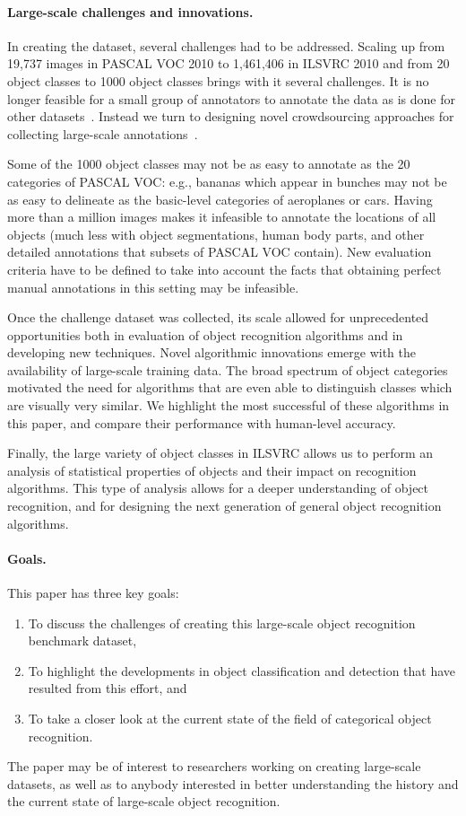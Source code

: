 \paragraph{Large-scale challenges and innovations.} In creating the dataset, several challenges had to be addressed. Scaling up from 19,737 images in PASCAL VOC 2010 to 1,461,406
in ILSVRC 2010 and  from 20 object classes to 1000 object classes brings with it several challenges. It is no longer feasible for a small group of annotators to annotate the data
as is done for other datasets~\citep{Caltech101,MSRC,PASCALVOC,SUN}.  Instead we turn to designing novel crowdsourcing approaches for collecting large-scale annotations~\citep{Su12,ImageNet,Deng14}.

Some of the 1000 object classes may not be as easy to annotate as the 20 categories of PASCAL VOC: e.g., bananas which appear in bunches may not be as easy to delineate as the basic-level categories of aeroplanes or cars. Having more than a million images makes it infeasible to annotate the locations of all objects (much less with object segmentations, human body parts, and other detailed annotations that subsets of PASCAL VOC contain). New evaluation criteria  have to be defined to take into account the facts that obtaining perfect manual annotations in this setting may be infeasible.

Once the challenge dataset was collected, its scale allowed for
unprecedented opportunities both in evaluation of object recognition
algorithms and in developing new techniques. Novel algorithmic innovations emerge with the availability of large-scale training data.  The broad spectrum of object categories motivated the 
need for algorithms that are even able to distinguish classes which are visually very similar. We highlight the most successful of these algorithms in this paper, and compare their performance with human-level accuracy.

Finally, the large variety of object classes in ILSVRC allows us to perform an analysis of statistical properties of objects and their impact on recognition algorithms. This type of analysis allows for a deeper understanding of object recognition, and for designing the next generation of general object recognition algorithms.

\paragraph{Goals.} This paper has three key goals:
\begin{enumerate}
\item To discuss the challenges of creating this large-scale object recognition benchmark dataset,
\item To highlight
the developments in  object classification and detection that have resulted from this effort, and 
\item To take a closer look at the current state of the field
of categorical object recognition.
\end{enumerate}
The paper may be of interest to researchers working on creating large-scale datasets, as well as to anybody interested in better understanding the history and the current state of large-scale object recognition.

